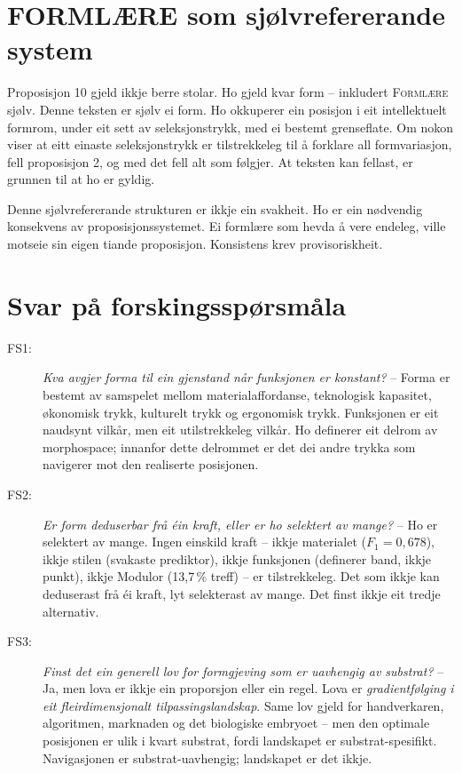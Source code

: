 \documentclass[12pt,a4paper,oneside]{report}
\begin{document}
\section{FORMLÆRE som sjølvrefererande system}

Proposisjon 10 gjeld ikkje berre stolar. Ho gjeld kvar form -- inkludert \textsc{Formlære} sjølv. Denne teksten er sjølv ei form. Ho okkuperer ein posisjon i eit intellektuelt formrom, under eit sett av seleksjonstrykk, med ei bestemt grenseflate. Om nokon viser at eitt einaste seleksjonstrykk er tilstrekkeleg til å forklare all formvariasjon, fell proposisjon 2, og med det fell alt som følgjer. At teksten kan fellast, er grunnen til at ho er gyldig.

Denne sjølvrefererande strukturen er ikkje ein svakheit. Ho er ein nødvendig konsekvens av proposisjonssystemet. Ei formlære som hevda å vere endeleg, ville motseie sin eigen tiande proposisjon. Konsistens krev provisoriskheit.

\section{Svar på forskingsspørsmåla}

\begin{description}
  \item[FS1:] \emph{Kva avgjer forma til ein gjenstand når funksjonen er konstant?} -- Forma er bestemt av samspelet mellom materialaffordanse, teknologisk kapasitet, økonomisk trykk, kulturelt trykk og ergonomisk trykk. Funksjonen er eit naudsynt vilkår, men eit utilstrekkeleg vilkår. Ho definerer eit delrom av morphospace; innanfor dette delrommet er det dei andre trykka som navigerer mot den realiserte posisjonen.

  \item[FS2:] \emph{Er form deduserbar frå éin kraft, eller er ho selektert av mange?} -- Ho er selektert av mange. Ingen einskild kraft -- ikkje materialet ($F_1 = 0{,}678$), ikkje stilen (svakaste prediktor), ikkje funksjonen (definerer band, ikkje punkt), ikkje Modulor (13,7\,\% treff) -- er tilstrekkeleg. Det som ikkje kan deduserast frå éi kraft, lyt selekterast av mange. Det finst ikkje eit tredje alternativ.

  \item[FS3:] \emph{Finst det ein generell lov for formgjeving som er uavhengig av substrat?} -- Ja, men lova er ikkje ein proporsjon eller ein regel. Lova er \emph{gradientfølging i eit fleirdimensjonalt tilpassingslandskap}. Same lov gjeld for handverkaren, algoritmen, marknaden og det biologiske embryoet -- men den optimale posisjonen er ulik i kvart substrat, fordi landskapet er substrat-spesifikt. Navigasjonen er substrat-uavhengig; landskapet er det ikkje.
\end{description}
\end{document}

